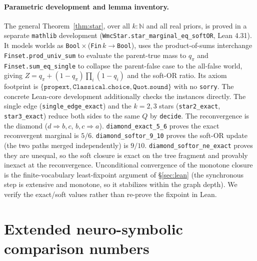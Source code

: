 \documentclass[letterpaper]{article}
\begin{document}
\paragraph{Parametric development and lemma inventory.}
The general Theorem~\ref{thm:star}, over all $k:\mathbb{N}$ and all real priors, is proved in a
separate \texttt{mathlib} development (\texttt{WmcStar.star\_marginal\_eq\_softOR}, Lean 4.31).
It models worlds as \texttt{Bool}\,$\times$\,(\texttt{Fin}\,$k\to$\texttt{Bool}), uses the
product-of-sums interchange \texttt{Finset.prod\_univ\_sum} to evaluate the parent-true mass to
$q_\pi$ and \texttt{Finset.sum\_eq\_single} to collapse the parent-false case to the all-false
world, giving $Z=q_\pi+(1-q_\pi)\prod_i(1-q_i)$ and the soft-OR ratio. Its axiom footprint is
$\{\texttt{propext},\texttt{Classical.choice},\texttt{Quot.sound}\}$ with no \texttt{sorry}. The
concrete Lean-core development additionally checks the instances directly. The single edge
(\texttt{single\_edge\_exact}) and the $k{=}2,3$ stars (\texttt{star2\_exact},
\texttt{star3\_exact}) reduce both sides to the same $Q$ by \texttt{decide}. The reconvergence is the diamond
($d\!\Rightarrow\!b,c$, $b,c\!\Rightarrow\!a$). \texttt{diamond\_exact\_5\_6} proves the exact
reconvergent marginal is $5/6$. \texttt{diamond\_softor\_9\_10} proves the soft-OR update (the
two paths merged independently) is $9/10$. \texttt{diamond\_softor\_ne\_exact} proves they
are unequal, so the soft closure is exact on the tree fragment and provably inexact at the
reconvergence. Unconditional convergence of the monotone closure is the finite-vocabulary
least-fixpoint argument of \S\ref{sec:lean} (the synchronous step is extensive and monotone, so
it stabilizes within the graph depth). We verify the exact/soft values rather than re-prove the
fixpoint in Lean.

\section{Extended neuro-symbolic comparison numbers}\label{app:nesy}
\end{document}
